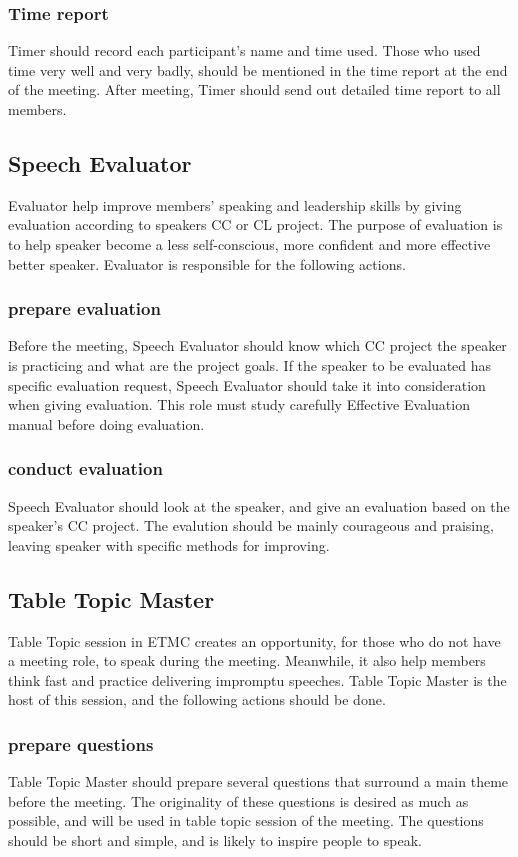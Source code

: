 \subsubsection{Time report}
Timer should record each participant's name and time used. Those who used time very 
well and very badly, should be mentioned in the time report at the end of the meeting.
After meeting, Timer should send out detailed time report to all members.


\subsection{Speech Evaluator}
Evaluator help improve members' speaking and leadership skills by giving evaluation 
according to speakers CC or CL project. The purpose of evaluation is to help speaker
become a less self-conscious, more confident and more effective better speaker. 
Evaluator is responsible for the following actions.

\subsubsection{prepare evaluation}
Before the meeting, Speech Evaluator should know which CC project the speaker is 
practicing and what are the project goals. If the speaker to be evaluated has specific
evaluation request, Speech Evaluator should take it into consideration when giving
evaluation. This role must study carefully Effective Evaluation manual before doing 
evaluation.

\subsubsection{conduct evaluation}
Speech Evaluator should look at the speaker, and give an evaluation based on the 
speaker's CC project. The evalution should be mainly courageous and praising, leaving
speaker with specific methods for improving. 

\subsection{Table Topic Master}
Table Topic session in ETMC creates an opportunity, for those who do not have a 
meeting role, to speak during the meeting. Meanwhile, it also help members think fast 
and practice delivering impromptu speeches. Table Topic Master is the host of this 
session, and the following actions should be done.

\subsubsection{prepare questions}
Table Topic Master should prepare several questions that surround a main theme before 
the meeting. The originality of these questions is desired as much as possible, and 
will be used in table topic session of the meeting. The questions should be short and
simple, and is likely to inspire people to speak.

